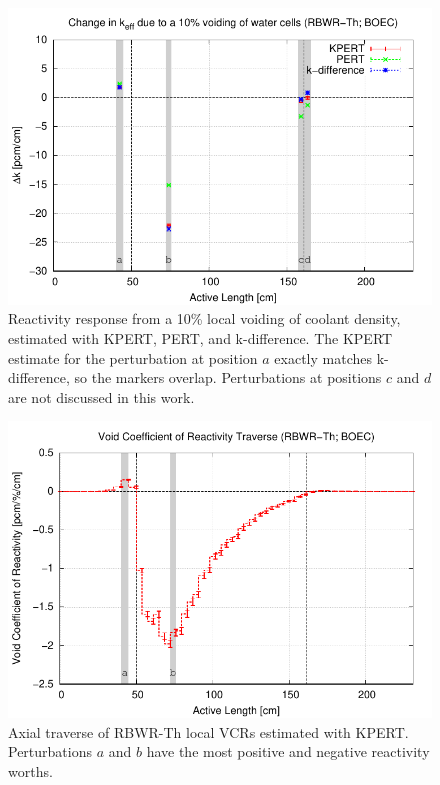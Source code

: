 \documentclass[11pt]{article}
\begin{document}
\clearpage
\begin{figure}[p]
  \centering
  \includegraphics[width=\textwidth, trim=0 0 0 0.275in, clip]{./img/Th-Verify.pdf}
  \caption{Reactivity response from a 10\% local voiding of coolant density, estimated with KPERT, PERT, and k-difference. The KPERT estimate for the perturbation at position $a$ exactly matches k-difference, so the markers overlap. Perturbations at positions $c$ and $d$ are not discussed in this work.}
  \label{fig:verify}
\end{figure}

\clearpage
\begin{figure}[p]
  \centering
  \includegraphics[width=\textwidth, trim=0 0 0 0.275in, clip]{./img/Th-KPERT.pdf}
  \caption{Axial traverse of RBWR-Th local VCRs estimated with KPERT. Perturbations $a$ and $b$ have the most positive and negative reactivity worths.}
  \label{fig:kpert}
\end{figure}
\end{document}

